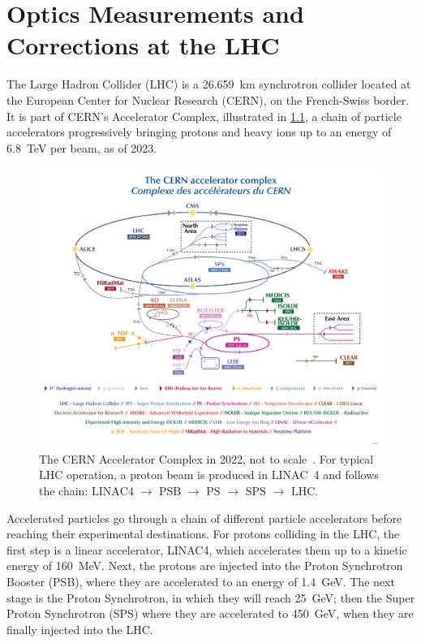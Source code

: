 \chapter{Optics Measurements and Corrections at the LHC}
\label{chapter:lhc_omc} %

The Large Hadron Collider (LHC) is a \qty{26.659}{\kilo\metre} synchrotron collider located at the European Center for Nuclear Research (CERN), on the French-Swiss border.
It is part of CERN's Accelerator Complex, illustrated in \cref{figure:cern_accelerator_complex}, a chain of particle accelerators progressively bringing protons and heavy ions up to an energy of \qty{6.8}{\tera\electronvolt} per beam, as of \num{2023}.

\begin{figure}[!htb]
  \centering
  \includegraphics*[width=0.9\linewidth]{Figures/Optics_Measurements_Corrections_at_LHC/cern_accelerator_complex.png}
  \caption{The CERN Accelerator Complex in \num{2022}, not to scale~\cite{Website:CERN_Accelerator_Complex_Resource}. For typical LHC operation, a proton beam is produced in \(\mathrm{LINAC}\)~\num{4} and follows the chain: \(\mathrm{LINAC}\)\num{4} \(\rightarrow\) \(\mathrm{PSB}\) \(\rightarrow\) \(\mathrm{PS}\) \(\rightarrow\) \(\mathrm{SPS}\) \(\rightarrow\) \(\mathrm{LHC}\).}
  \label{figure:cern_accelerator_complex}
\end{figure}

Accelerated particles go through a chain of different particle accelerators before reaching their experimental destinations.
For protons colliding in the LHC, the first step is a linear accelerator, LINAC\num{4}, which accelerates them up to a kinetic energy of \qty{160}{\mega\electronvolt}.
Next, the protons are injected into the Proton Synchrotron Booster (PSB), where they are accelerated to an energy of \qty{1.4}{\giga\electronvolt}.
The next stage is the Proton Synchrotron, in which they will reach \qty{25}{\giga\electronvolt}; then the Super Proton Synchrotron (SPS) where they are accelerated to \qty{450}{\giga\electronvolt}, when they are finally injected into the LHC.

